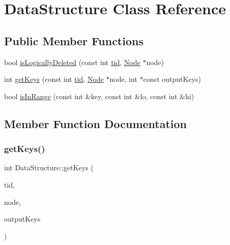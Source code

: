 \hypertarget{classDataStructure}{}\section{Data\+Structure Class Reference}
\label{classDataStructure}
\subsection*{Public Member Functions}
\begin{DoxyCompactItemize}
\item 
bool \hyperlink{classDataStructure_a2337ec8648b072fe214cf5be64a9b17a}{is\+Logically\+Deleted} (const int \hyperlink{microbench_2main_8cpp_a9ca9869868fe7e7a38a921cc7de4103f}{tid}, \hyperlink{classNode}{Node} $\ast$node)
\item 
int \hyperlink{classDataStructure_a1ea00bcbb259242ccff16765b78cf3a5}{get\+Keys} (const int \hyperlink{microbench_2main_8cpp_a9ca9869868fe7e7a38a921cc7de4103f}{tid}, \hyperlink{classNode}{Node} $\ast$node, int $\ast$const output\+Keys)
\item 
bool \hyperlink{classDataStructure_acfd7c8c402a2d2629359d0c446b23d10}{is\+In\+Range} (const int \&key, const int \&lo, const int \&hi)
\end{DoxyCompactItemize}


\subsection{Member Function Documentation}
\mbox{\label{classDataStructure_a1ea00bcbb259242ccff16765b78cf3a5}} 
\subsubsection{\texorpdfstring{get\+Keys()}{getKeys()}}
{\footnotesize\ttfamily int Data\+Structure\+::get\+Keys (\begin{DoxyParamCaption}\item[{const int}]{tid,  }\item[{\hyperlink{classNode}{Node} $\ast$}]{node,  }\item[{int $\ast$const}]{output\+Keys }\end{DoxyParamCaption})\hspace{0.3cm}{\ttfamily [inline]}}


